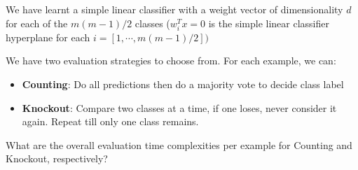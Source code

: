 \documentclass[12pt]{article}
\begin{document}
\begin{enumerate}
We have learnt a simple linear classifier with a weight vector of dimensionality $d$ for each of the $ m(m-1)/2$ classes ($w_i^T x = 0$ is the simple linear classifier hyperplane for each  $i =[1, \cdots , m(m-1)/2] )$

We have two evaluation strategies to choose from. For each example, we can:
\begin{itemize}
  \item \textbf{Counting}: Do all predictions then do a majority vote to decide class label
  \item \textbf{Knockout}: Compare two classes at a time, if one loses, never consider it
again. Repeat till only one class remains.
\end{itemize}
What are the overall evaluation time complexities per example for Counting and
Knockout, respectively?
\end{enumerate}
\end{document}
